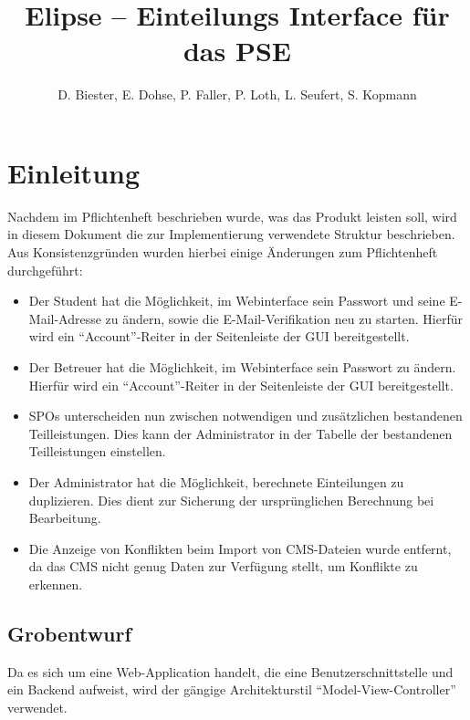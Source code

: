 \documentclass[parskip=full]{scrartcl}
\begin{document}
\title{Elipse -- Einteilungs Interface für das PSE}
\author{D. Biester, E. Dohse, P. Faller, P. Loth, L. Seufert, S. Kopmann}
\zweitgutachter{}

\mytitlepage

\tableofcontents
\pagebreak

\section{Einleitung}
Nachdem im Pflichtenheft beschrieben wurde, was das Produkt leisten soll, wird in
diesem Dokument die zur Implementierung verwendete Struktur beschrieben. Aus
Konsistenzgründen wurden hierbei einige Änderungen zum Pflichtenheft
durchgeführt:
\begin{itemize}
  \item Der Student hat die Möglichkeit, im Webinterface sein Passwort und seine
  E-Mail-Adresse zu ändern, sowie die E-Mail-Verifikation neu zu starten.
  Hierfür wird ein \enquote{Account}-Reiter in der Seitenleiste der GUI
  bereitgestellt.
  \item Der Betreuer hat die Möglichkeit, im Webinterface sein Passwort zu
  ändern. Hierfür wird ein \enquote{Account}-Reiter in der Seitenleiste der GUI
  bereitgestellt.
  \item SPOs unterscheiden nun zwischen notwendigen und zusätzlichen bestandenen
  Teilleistungen. Dies kann der Administrator in der Tabelle der bestandenen
  Teilleistungen einstellen.
  \item Der Administrator hat die Möglichkeit, berechnete Einteilungen zu
  duplizieren. Dies dient zur Sicherung der ursprünglichen Berechnung bei
  Bearbeitung.
  \item Die Anzeige von Konflikten beim Import von CMS-Dateien wurde entfernt,
  da das CMS nicht genug Daten zur Verfügung stellt, um Konflikte zu erkennen.
\end{itemize}
\subsection{Grobentwurf}
Da es sich um eine Web-Application handelt, die eine Benutzerschnittstelle und
ein Backend aufweist, wird der gängige Architekturstil \enquote{Model-View-Controller}
verwendet.
\end{document}
